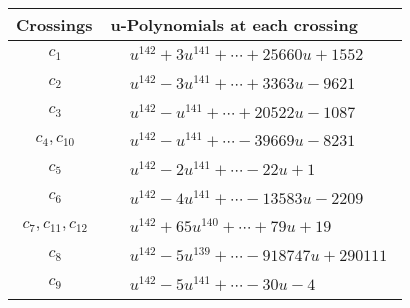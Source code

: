 \documentclass[1p]{elsarticle_modified}
\theoremstyle{definition}
\begin{document}
\begin{tabular}{m{50pt}|m{274pt}}
Crossings & \hspace{64pt}u-Polynomials at each crossing \\
\hline $$\begin{aligned}c_{1}\end{aligned}$$&$\begin{aligned}
&u^{142}+3 u^{141}+\cdots+25660 u+1552
\end{aligned}$\\
\hline $$\begin{aligned}c_{2}\end{aligned}$$&$\begin{aligned}
&u^{142}-3 u^{141}+\cdots+3363 u-9621
\end{aligned}$\\
\hline $$\begin{aligned}c_{3}\end{aligned}$$&$\begin{aligned}
&u^{142}- u^{141}+\cdots+20522 u-1087
\end{aligned}$\\
\hline $$\begin{aligned}c_{4},c_{10}\end{aligned}$$&$\begin{aligned}
&u^{142}- u^{141}+\cdots-39669 u-8231
\end{aligned}$\\
\hline $$\begin{aligned}c_{5}\end{aligned}$$&$\begin{aligned}
&u^{142}-2 u^{141}+\cdots-22 u+1
\end{aligned}$\\
\hline $$\begin{aligned}c_{6}\end{aligned}$$&$\begin{aligned}
&u^{142}-4 u^{141}+\cdots-13583 u-2209
\end{aligned}$\\
\hline $$\begin{aligned}c_{7},c_{11},c_{12}\end{aligned}$$&$\begin{aligned}
&u^{142}+65 u^{140}+\cdots+79 u+19
\end{aligned}$\\
\hline $$\begin{aligned}c_{8}\end{aligned}$$&$\begin{aligned}
&u^{142}-5 u^{139}+\cdots-918747 u+290111
\end{aligned}$\\
\hline $$\begin{aligned}c_{9}\end{aligned}$$&$\begin{aligned}
&u^{142}-5 u^{141}+\cdots-30 u-4
\end{aligned}$\\
\hline
\end{tabular}\\~\\
\end{document}
